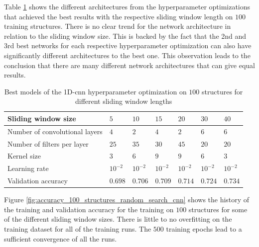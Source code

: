 \documentclass[conference]{IEEEtran}
\begin{document}
Table \ref{tab:hyperparameters_100_structures_cnn} shows the different architectures from the hyperparameter optimizations that achieved the best results with the respective sliding window length on $ 100 $ training structures. There is no clear trend for the network architecture in relation to the sliding window size. This is backed by the fact that the 2nd and 3rd best networks for each respective hyperparameter optimization can also have significantly different architectures to the best one. This observation leads to the conclusion that there are many different network architectures that can give equal results.

\begin{table}[htp]
	\centering
	\caption{Best models of the 1D-\gls{cnn} hyperparameter optimization on $ 100 $ structures for different sliding window lengths}
	\label{tab:hyperparameters_100_structures_cnn}
	\setlength{\tabcolsep}{3pt} %
	\begin{tabular}{p{2.5cm}|llllll}
		Sliding window size & $ 5 $ & $ 10 $ & $ 15 $ & $ 20 $ & $ 30 $ & $ 40 $ \\
		\hline
		Number of convolutional layers & $ 4 $ & $ 2 $ & $ 4 $ & $ 2 $ & $ 6 $ & $ 6 $ \\
		Number of filters per layer & $ 25 $ & $ 35 $ & $ 30 $ & $ 45 $ & $ 20 $ & $ 20 $ \\
		Kernel size & $ 3 $ & $ 6 $ & $ 9 $ & $ 9 $ & $ 6 $ & $ 3 $ \\
		Learning rate & $ 10^{-2} $ & $ 10^{-2} $ & $ 10^{-2} $ & $ 10^{-2} $ & $ 10^{-2} $ & $ 10^{-2} $ \\
		\hline
		Validation accuracy & $ 0.698 $ & $ 0.706 $ & $ 0.709 $ & $ 0.714 $ & $ 0.724 $ & $ 0.734 $
	\end{tabular}
\end{table}

Figure \ref{fig:accuracy_100_structures_random_search_cnn} shows the history of the training and validation accuracy for the training on $ 100 $ structures for some of the different sliding window sizes. There is little to no overfitting on the training dataset for all of the training runs. The $ 500 $ training epochs lead to a sufficient convergence of all the runs.
\end{document}
